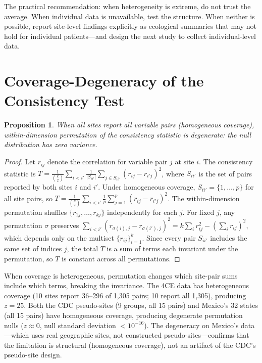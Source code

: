 \documentclass{article}
\newtheorem{proposition}{Proposition}
\begin{document}
The practical recommendation: when heterogeneity is extreme, do not trust the
average.  When individual data is unavailable, test the structure.  When
neither is possible, report site-level findings explicitly as ecological
summaries that may not hold for individual patients---and design the next
study to collect individual-level data.


\appendix

\section{Coverage-Degeneracy of the Consistency Test}
\label{app:degeneracy}

\begin{proposition}
When all sites report all variable pairs (homogeneous coverage), within-dimension permutation of the consistency statistic is degenerate: the null distribution has zero variance.
\end{proposition}

\begin{proof}
Let $r_{ij}$ denote the correlation for variable pair $j$ at site $i$.  The consistency statistic is $T = \frac{1}{\binom{k}{2}} \sum_{i < i'} \frac{1}{|S_{ii'}|} \sum_{j \in S_{ii'}} (r_{ij} - r_{i'j})^2$, where $S_{ii'}$ is the set of pairs reported by both sites $i$ and $i'$.
Under homogeneous coverage, $S_{ii'} = \{1, \ldots, p\}$ for all site pairs, so $T = \frac{1}{\binom{k}{2}} \sum_{i < i'} \frac{1}{p} \sum_{j=1}^{p} (r_{ij} - r_{i'j})^2$.
The within-dimension permutation shuffles $\{r_{1j}, \ldots, r_{kj}\}$ independently for each $j$.
For fixed $j$, any permutation $\sigma$ preserves $\sum_{i<i'} (r_{\sigma(i),j} - r_{\sigma(i'),j})^2 = k \sum_i r_{ij}^2 - (\sum_i r_{ij})^2$, which depends only on the multiset $\{r_{ij}\}_{i=1}^k$.
Since every pair $S_{ii'}$ includes the same set of indices $j$, the total $T$ is a sum of terms each invariant under the permutation, so $T$ is constant across all permutations.
\end{proof}

When coverage is heterogeneous, permutation changes which site-pair sums include which terms, breaking the invariance.  The 4CE data has heterogeneous coverage (10 sites report 36--296 of 1,305 pairs; 10 report all 1,305), producing $z = 25$.  Both the CDC pseudo-sites (9 groups, all 15 pairs) and Mexico's 32 states (all 15 pairs) have homogeneous coverage, producing degenerate permutation nulls ($z \approx 0$, null standard deviation $< 10^{-16}$).  The degeneracy on Mexico's data---which uses real geographic sites, not constructed pseudo-sites---confirms that the limitation is structural (homogeneous coverage), not an artifact of the CDC's pseudo-site design.



\end{document}
